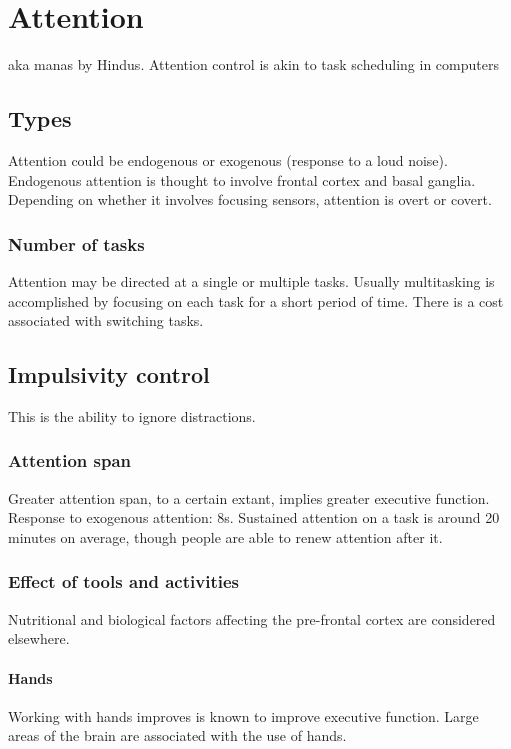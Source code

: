 \documentclass[oneside, article]{memoir}
\begin{document}
\chapter{Attention}
aka manas by Hindus. Attention control is akin to task scheduling in computers

\section{Types}
Attention could be endogenous or exogenous (response to a loud noise). Endogenous attention is thought to involve frontal cortex and basal ganglia. Depending on whether it involves focusing sensors, attention is overt or covert.

\subsection{Number of tasks}
Attention may be directed at a single or multiple tasks. Usually multitasking is accomplished by focusing on each task for a short period of time. There is a cost associated with switching tasks.

\section{Impulsivity control}
This is the ability to ignore distractions.


\subsection{Attention span}
Greater attention span, to a certain extant, implies greater executive function. Response to exogenous attention: 8s. Sustained attention on a task is around 20 minutes on average, though people are able to renew attention after it.


\subsection{Effect of tools and activities}
Nutritional and biological factors affecting the pre-frontal cortex are considered elsewhere.

\subsubsection{Hands}
Working with hands improves is known to improve executive function. Large areas of the brain are associated with the use of hands.
\end{document}
